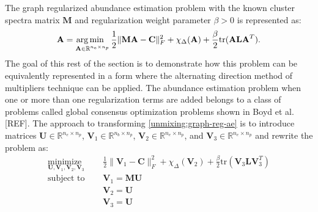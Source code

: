 The graph regularized abundance estimation problem with the known cluster spectra matrix $\mathbf{M}$ and regularization weight parameter $\beta > 0$ is represented as:
\begin{equation}
    \label{unmixing:graph-reg-ae}
    \mathbf{A} = \operatorname*{arg\,min \;\;}_{\mathbf{A} \in \mathbb{R}^{n_e \times n_p}} \frac{1}{2}\|\mathbf{MA} - \mathbf{C}\|_F^2 + \chi_\Delta(\mathbf{A}) + \frac{\beta}{2}\text{tr}(\mathbf{ALA}^T).
\end{equation}
The goal of this rest of the section is to demonstrate how this problem can be equivalently represented in a form where the alternating direction method of multipliers technique can be applied. The abundance estimation problem when one or more than one regularization terms are added belongs to a class of problems called global consensus optimization problems shown in Boyd et al. [REF]. The approach to transforming \eqref{unmixing:graph-reg-ae} is to introduce matrices $\mathbf{U} \in \mathbb{R}^{n_e \times n_p}$, $\mathbf{V}_1 \in \mathbb{R}^{n_b \times n_p}$, $\mathbf{V}_2 \in \mathbb{R}^{n_e \times n_p}$, and $\mathbf{V}_{3} \in \mathbb{R}^{n_e \times n_p}$ and rewrite the problem as:
\begin{equation}
    \label{unmixing:graph-reg-ae-admm-1}
    \begin{aligned}
        \underset{\mathbf{U}, \mathbf{V}_1, \mathbf{V}_2, \mathbf{V}_3}{\text{minimize }} & \quad \frac{1}{2} \|\mathbf{V}_1 - \mathbf{C} \|_F^2 + \chi_{\Delta}(\mathbf{V}_2) + \frac{\beta}{2}\text{tr}(\mathbf{V}_3 \mathbf{L} \mathbf{V}_3^T) 
        \\         
        \text{subject to } &  \quad \mathbf{V}_1 = \mathbf{MU} \\
        & \quad \mathbf{V}_2 = \mathbf{U} \\
        & \quad \mathbf{V}_{3} = \mathbf{U}
   \end{aligned}
\end{equation}

